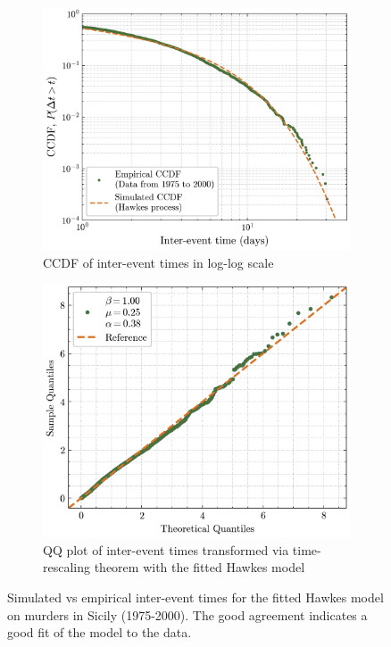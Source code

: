 \begin{figure}[H]
    \centering
    \begin{subfigure}[t]{.49\textwidth}
        \centering
        \includegraphics[width=\textwidth]{figures/hawkes-ccdf.png}
        \caption{CCDF of inter-event times in log-log scale}
        \label{fig:hawkes-ccdf}
    \end{subfigure}%
    \hspace{1em}
    \begin{subfigure}[t]{.47\textwidth}
        \centering
        \includegraphics[width=\textwidth]{figures/hawkes-qq.png}
        \caption{QQ plot of inter-event times transformed via time-rescaling theorem with the fitted Hawkes model}
        \label{fig:hawkes-qq}
    \end{subfigure}
    \caption{Simulated vs empirical inter-event times for the fitted Hawkes model on murders in Sicily (1975-2000). The good agreement indicates a good fit of the model to the data.}
\end{figure}